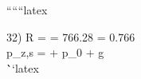 
``````latex


32) \quad R =  = 766.28  = 0.766  \\

p_{z,s} =  + p_0 +  \cdot g \\
\quad \quad \quad \quad \quad \quad \quad \quad \quad \quad \quad \quad \quad \quad \quad \quad \quad \quad \quad \quad \quad \quad \quad \quad \quad \quad \quad \quad \quad \quad \quad \quad \quad \quad \quad \quad \quad \quad \quad \quad \quad \quad \quad \quad \quad \quad \quad \quad \quad \quad \quad \quad \quad \quad \quad \quad \quad \quad \quad \quad \quad \quad \quad \quad \quad \quad \quad \quad \quad \quad \quad \quad \quad \quad \quad \quad \quad \quad \quad \quad \quad \quad \quad \quad \quad \quad \quad \quad \quad \quad \quad \quad \quad \quad \quad \quad \quad \quad \quad \quad \quad \quad \quad \quad \quad \quad \quad \quad \quad \quad \quad \quad \quad \quad \quad \quad \quad \quad \quad \quad \quad \quad \quad \quad \quad \quad \quad \quad \quad \quad \quad \quad \quad \quad \quad \quad \quad \quad \quad \quad \quad \quad \quad \quad \quad \quad \quad \quad \quad \quad \quad \quad \quad \quad \quad \quad \quad \quad \quad \quad \quad \quad \quad \quad \quad \quad \quad \quad \quad \quad \quad \quad \quad \quad \quad \quad \quad \quad \quad \quad \quad \quad \quad \quad \quad \quad \quad \quad \quad \quad \quad \quad \quad \quad \quad \quad \quad \quad \quad \quad \quad \quad \quad \quad \quad \quad \quad \quad \quad \quad \quad \quad \quad \quad \quad \quad \quad \quad \quad \quad \quad \quad \quad \quad \quad \quad \quad \quad \quad \quad \quad \quad \quad \quad \quad \quad \quad \quad \quad \quad \quad \quad \quad \quad \quad \quad \quad \quad \quad \quad \quad \quad \quad \quad \quad \quad \quad \quad \quad \quad \quad \quad \quad \quad \quad \quad \quad \quad \quad \quad \quad \quad \quad \quad \quad \quad \quad \quad \quad \quad \quad \quad \quad \quad \quad \quad \quad \quad \quad \quad \quad \quad \quad \quad \quad \quad \quad \quad \quad \quad \quad \quad \quad \quad \quad \quad \quad \quad \quad \quad \quad \quad \quad \quad \quad \quad \quad \quad \quad \quad \quad \quad \quad \quad \quad \quad \quad \quad \quad \quad \quad \quad \quad \quad \quad \quad \quad \quad \quad \quad \quad \quad \quad \quad \quad \quad \quad \quad \quad \quad \quad \quad \quad \quad \quad \quad \quad \quad \quad \quad \quad \quad \quad \quad \quad \quad \quad \quad \quad \quad \quad \quad \quad \quad \quad \quad \quad \quad \quad \quad \quad \quad \quad \quad \quad \quad \quad \quad \quad \quad \quad \quad \quad \quad \quad \quad \quad \quad \quad \quad \quad \quad \quad \quad \quad \quad \quad \quad \quad \quad \quad \quad \quad \quad \quad \quad \quad \quad \quad \quad \quad \quad \quad \quad \quad \quad \quad \quad \quad \quad \quad \quad \quad \quad \quad \quad \```latex


